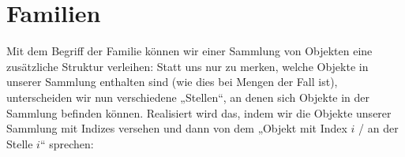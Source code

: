 \begin{comment}
\begin{nota}[Sprechweisen bei $\in$ und $\subseteq$]
    Seien $M,N$ zwei Mengen und $x$ irgendein Objekt. Lesarten für die Elementaussage „$x\in M$“ sind
    \begin{itemize}
        \item „$x$ ist ein Element von $M$“
        \item „$x$ liegt in $M$“
        \item „$x$ ist enthalten in $M$“
        \item „$x$ wird von $M$ umfasst“
    \end{itemize}
    Lesarten für die Teilmengenaussage „$N\subseteq M$“ sind:
    \begin{itemize}
        \item „$N$ ist eine Teilmenge von $M$“
        \item „$N$ liegt in $M$”
        \item „$N$ ist enthalten in $M$“
        \item „$N$ wird von $M$ umfasst“
    \end{itemize}
    Die Ausdrücke „liegt in“, „enthält“, „umfasst“ sind also mehrdeutig und können sowohl ein Elementverhältnis als auch ein Teilmengenverhältnis beschreiben. Ohne Weiteres ist nicht klar, ob „$M$ liegt in $N$“ besagen soll, dass $M\in N$ oder $M\subseteq N$. Beides ist möglich; zum Beispiel ist
    \begin{align*}
        \N \subseteq \Z \qquad & \text{aber}\qquad \N \notin \Z \\
        \N \in \{ \N,\Z,\Q,\R,\C\} \qquad & \text{aber}\qquad \N \nsubseteq  \{ \N,\Z,\Q,\R,\C\}
    \end{align*}
    Meistens ist die Bedeutung der Wörter „enthält“, „umfasst“ etc. aus dem Kontext unmittelbar ersichtlich, weshalb deren Mehrdeutigkeit unproblematisch ist. Besteht dennoch die Gefahr eines Missverständnisses, solltest du explizit „ist Teilmenge von“ oder „ist Element von“ schreiben.
\end{nota}
\end{comment}





\section{Familien}


Mit dem Begriff der Familie können wir einer Sammlung von Objekten eine zusätzliche Struktur verleihen: Statt uns nur zu merken, welche Objekte in unserer Sammlung enthalten sind (wie dies bei Mengen der Fall ist), unterscheiden wir nun verschiedene „Stellen“, an denen sich Objekte in der Sammlung befinden können. Realisiert wird das, indem wir die Objekte unserer Sammlung mit Indizes versehen und dann von dem „Objekt mit Index $i$ / an der Stelle $i$“ sprechen:


